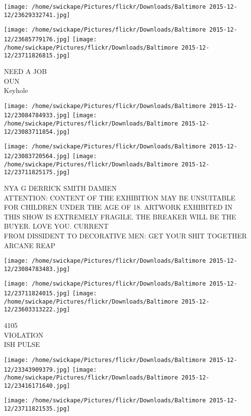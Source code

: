 \documentclass[10pt,letterpaper]{article}
\begin{document}
\texttt{[image: /home/swickape/Pictures/flickr/Downloads/Baltimore 2015-12-12/23629332741.jpg]}

\vspace{0.25in}
\texttt{[image: /home/swickape/Pictures/flickr/Downloads/Baltimore 2015-12-12/23685779176.jpg]}
\texttt{[image: /home/swickape/Pictures/flickr/Downloads/Baltimore 2015-12-12/23711826815.jpg]}

NEED A JOB\\
OUN\\
Keyhole
\pagebreak

\texttt{[image: /home/swickape/Pictures/flickr/Downloads/Baltimore 2015-12-12/23084784933.jpg]}
\texttt{[image: /home/swickape/Pictures/flickr/Downloads/Baltimore 2015-12-12/23083711854.jpg]}

\texttt{[image: /home/swickape/Pictures/flickr/Downloads/Baltimore 2015-12-12/23083720564.jpg]}
\texttt{[image: /home/swickape/Pictures/flickr/Downloads/Baltimore 2015-12-12/23711825175.jpg]}

NYA G DERRICK SMITH DAMIEN\\
ATTENTION: CONTENT OF THE EXHIBITION MAY BE UNSUITABLE FOR CHILDREN UNDER THE AGE OF 18.  ARTWORK EXHIBITED IN THIS SHOW IS EXTREMELY FRAGILE.  THE BREAKER WILL BE THE BUYER.  LOVE YOU.  CURRENT\\
FROM DISSIDENT TO DECORATIVE MEN: GET YOUR SHIT TOGETHER\\
ARCANE REAP
\pagebreak

\texttt{[image: /home/swickape/Pictures/flickr/Downloads/Baltimore 2015-12-12/23084783483.jpg]}

\vspace{0.25in}
\texttt{[image: /home/swickape/Pictures/flickr/Downloads/Baltimore 2015-12-12/23711824015.jpg]}
\texttt{[image: /home/swickape/Pictures/flickr/Downloads/Baltimore 2015-12-12/23603313222.jpg]}

4105\\
VIOLATION\\
ISH PULSE
\pagebreak

\texttt{[image: /home/swickape/Pictures/flickr/Downloads/Baltimore 2015-12-12/23343909379.jpg]}
\texttt{[image: /home/swickape/Pictures/flickr/Downloads/Baltimore 2015-12-12/23416171640.jpg]}

\texttt{[image: /home/swickape/Pictures/flickr/Downloads/Baltimore 2015-12-12/23711821535.jpg]}
\end{document}
